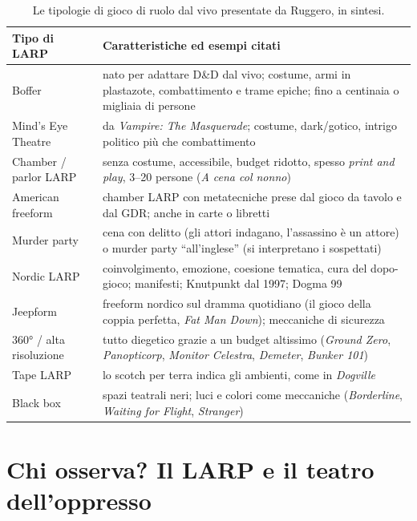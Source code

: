 \begin{table}[htbp]
\centering
\small
\begin{tabular}{@{}p{3.1cm}p{9.8cm}@{}}
\toprule
\textbf{Tipo di LARP} & \textbf{Caratteristiche ed esempi citati} \\
\midrule
Boffer & nato per adattare D\&D dal vivo; costume, armi in plastazote,
combattimento e trame epiche; fino a centinaia o migliaia di persone \\
Mind's Eye Theatre & da \emph{Vampire: The Masquerade}; costume, dark/gotico,
intrigo politico più che combattimento \\
Chamber / parlor LARP & senza costume, accessibile, budget ridotto, spesso
\emph{print and play}, 3--20 persone (\emph{A cena col nonno}) \\
American freeform & chamber LARP con metatecniche prese dal gioco da tavolo e
dal GDR; anche in carte o libretti \\
Murder party & cena con delitto (gli attori indagano, l'assassino è un attore)
o murder party ``all'inglese'' (si interpretano i sospettati) \\
Nordic LARP & coinvolgimento, emozione, coesione tematica, cura del dopo-gioco;
manifesti; Knutpunkt dal 1997; Dogma 99 \\
Jeepform & freeform nordico sul dramma quotidiano (il gioco della coppia
perfetta, \emph{Fat Man Down}); meccaniche di sicurezza \\
360° / alta risoluzione & tutto diegetico grazie a un budget altissimo
(\emph{Ground Zero}, \emph{Panopticorp}, \emph{Monitor Celestra},
\emph{Demeter}, \emph{Bunker 101}) \\
Tape LARP & lo scotch per terra indica gli ambienti, come in \emph{Dogville} \\
Black box & spazi teatrali neri; luci e colori come meccaniche
(\emph{Borderline}, \emph{Waiting for Flight}, \emph{Stranger}) \\
\bottomrule
\end{tabular}
\caption{Le tipologie di gioco di ruolo dal vivo presentate da Ruggero, in
sintesi.}
\label{a2:tab:larp}
\end{table}

\section{Chi osserva? Il LARP e il teatro dell'oppresso}
\label{a2:sec:oppresso}

